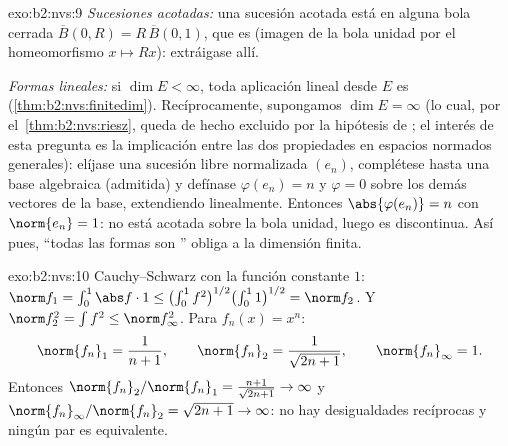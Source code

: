 \begin{solution}{exo:b2:nvs:9}
\emph{Sucesiones acotadas:} una sucesión acotada está en alguna bola
cerrada $\overline B(0, R) = R\,\overline B(0,1)$, que es 
(imagen de la bola unidad  por el homeomorfismo $x \mapsto
Rx$): extráigase allí.

\emph{Formas lineales:} si $\dim E < \infty$, toda aplicación lineal
desde $E$ es  (\cref{thm:b2:nvs:finitedim}).
Recíprocamente, supongamos $\dim E = \infty$ (lo cual, por el~\cref{thm:b2:nvs:riesz}, queda de hecho excluido por la hipótesis de
; el interés de esta pregunta es la implicación entre las
dos propiedades en espacios normados generales): elíjase una
sucesión libre normalizada $(e_n)$, complétese hasta una base
algebraica (admitida) y defínase $\varphi(e_n) = n$ y $\varphi = 0$
sobre los demás vectores de la base, extendiendo linealmente.
Entonces $\abs{\varphi(e_n)} = n$ con $\norm{e_n} = 1$: no está
acotada sobre la bola unidad, luego es discontinua. Así pues, ``todas
las formas son '' obliga a la dimensión finita.
\end{solution}

\begin{solution}{exo:b2:nvs:10}
Cauchy--Schwarz con la función constante $1$: $\norm f_1 = \int_0^1
\abs f\cdot 1 \leq \bigl(\int_0^1 f^2\bigr)^{1/2}\bigl(\int_0^1
1\bigr)^{1/2} = \norm f_2$. Y $\norm f_2^2 = \int f^2 \leq \norm
f_\infty^2$. Para $f_n(x) = x^n$:
\[
\norm{f_n}_1 = \frac1{n+1}, \qquad
\norm{f_n}_2 = \frac1{\sqrt{2n+1}}, \qquad
\norm{f_n}_\infty = 1 .
\]
Entonces $\norm{f_n}_2/\norm{f_n}_1 = \frac{n+1}{\sqrt{2n+1}} \to
\infty$ y $\norm{f_n}_\infty/\norm{f_n}_2 = \sqrt{2n+1} \to \infty$:
no hay desigualdades recíprocas y ningún par es equivalente.
\end{solution}


